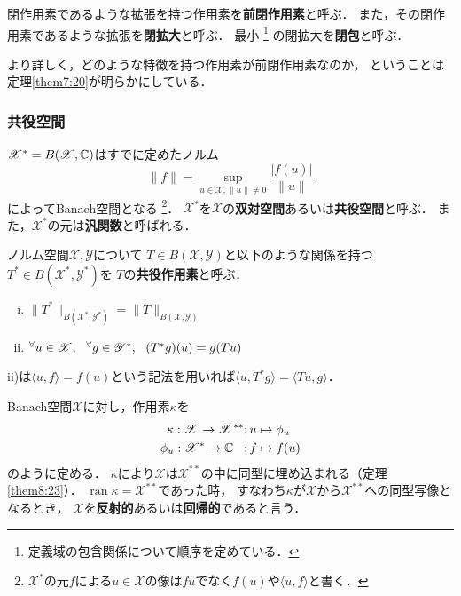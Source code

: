 \documentclass[a4j]{jsarticle}
\newcommand{\ran}{\operatorname{ran}}
\newcommand{\spX}{\mathscr{X}}
\newcommand{\spY}{\mathscr{Y}}
\newcommand{\spB}[2]{B(\mathscr{#1}, \mathscr{#2})}
\begin{document}
    \begin{Def}
        閉作用素であるような拡張を持つ作用素を\textbf{前閉作用素}と呼ぶ．
        また，その閉作用素であるような拡張を\textbf{閉拡大}と呼ぶ．
        最小 \footnote{定義域の包含関係について順序を定めている．} の閉拡大を\textbf{閉包}と呼ぶ．
    \end{Def}
    より詳しく，どのような特徴を持つ作用素が前閉作用素なのか，
    ということは定理\ref{them7:20}が明らかにしている．

    \subsubsection{共役空間}
    \begin{Def}
        $\spX^{\ast}=B(\spX, \C)$はすでに定めたノルム
        \[ \|f\|=\sup_{u \in \spX, \| u \| \neq 0}{ \frac{|f(u)|}{\|u\|} } \]
        によってBanach空間となる
        \footnote{$\spX^{\ast}$の元$f$による$u \in \spX$の像は$fu$でなく$f(u)$や$\langle u,f \rangle$と書く．}．
        $\spX^{\ast}$を$\spX$の\textbf{双対空間}あるいは\textbf{共役空間}と呼ぶ．
        また，$\spX^{\ast}$の元は\textbf{汎関数}と呼ばれる．
    \end{Def}
    \begin{Def}[定理8.20, p.187]
        ノルム空間$\spX, \spY$について
        $T \in \spB{X}{Y}$と以下のような関係を持つ$T^{\ast} \in \spB{X^{\ast}}{Y^{\ast}}$を
        $T$の\textbf{共役作用素}と呼ぶ．
        \begin{enumerate}[i)]
            \item $\|T^{\ast}\|_{\spB{X^{\ast}}{Y^{\ast}}}=\|T\|_{\spB{X}{Y}}$
            \item $\Forall{u \in \spX} \Forall{g \in \mathscr{Y^{\ast}}} (T^{\ast}g)(u)=g(Tu)$
        \end{enumerate}
        ii)は$\langle u,f \rangle=f(u)$という記法を用いれば$\langle u,T^* g \rangle=\langle Tu,g \rangle$．
    \end{Def}
    \begin{Def}
        Banach空間$\spX$に対し，作用素$\kappa$を
        \begin{align*}
            \kappa: \spX \to \spX^{\ast \ast}     &;u \mapsto \phi_{u} \\
            \phi_u: \mathscr{X^{\ast}} \to \C \hspace{3truemm}&;f \mapsto f(u)
        \end{align*}
        のように定める．
        $\kappa$により$\spX$は$\spX^{\ast \ast}$の中に同型に埋め込まれる（定理\ref{them8:23}）．
        $\ran \kappa=\spX^{\ast \ast}$であった時，
        すなわち$\kappa$が$\spX$から$\spX^{\ast \ast}$への同型写像となるとき，
        $\spX$を\textbf{反射的}あるいは\textbf{回帰的}であると言う．
    \end{Def}
\end{document}
